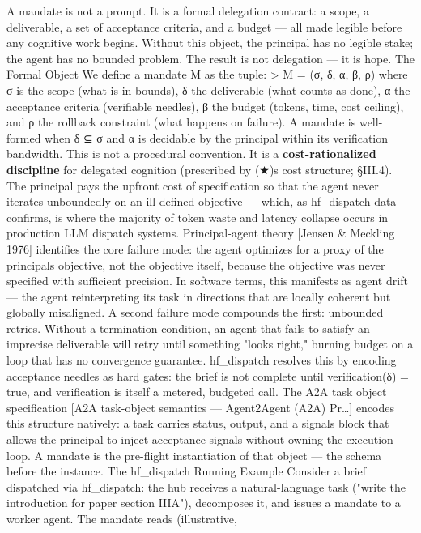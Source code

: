 \documentclass[
]{article}
\begin{document}
A mandate is not a prompt. It is a formal delegation contract: a scope,
a deliverable, a set of acceptance criteria, and a budget --- all made
legible before any cognitive work begins. Without this object, the
principal has no legible stake; the agent has no bounded problem. The
result is not delegation --- it is hope. The Formal Object We define a
mandate M as the tuple: \textgreater{} M = (σ, δ, α, β, ρ) where σ is
the scope (what is in bounds), δ the deliverable (what counts as done),
α the acceptance criteria (verifiable needles), β the budget (tokens,
time, cost ceiling), and ρ the rollback constraint (what happens on
failure). A mandate is well-formed when δ ⊆ σ and α is decidable by the
principal within its verification bandwidth. This is not a procedural
convention. It is a \textbf{cost-rationalized discipline} for delegated
cognition (prescribed by (★)\textquotesingle s cost structure; §III.4).
The principal pays the upfront cost of specification so that the agent
never iterates unboundedly on an ill-defined objective --- which, as
hf\_dispatch data confirms, is where the majority of token waste and
latency collapse occurs in production LLM dispatch systems.
Principal-agent theory {[}Jensen \& Meckling 1976{]} identifies the core
failure mode: the agent optimizes for a proxy of the
principal\textquotesingle s objective, not the objective itself, because
the objective was never specified with sufficient precision. In software
terms, this manifests as agent drift --- the agent reinterpreting its
task in directions that are locally coherent but globally misaligned. A
second failure mode compounds the first: unbounded retries. Without a
termination condition, an agent that fails to satisfy an imprecise
deliverable will retry until something "looks right," burning budget on
a loop that has no convergence guarantee. hf\_dispatch resolves this by
encoding acceptance needles as hard gates: the brief is not complete
until verification(δ) = true, and verification is itself a metered,
budgeted call. The A2A task object specification {[}A2A task-object
semantics --- Agent2Agent (A2A) Pr\ldots{]} encodes this structure
natively: a task carries status, output, and a signals block that allows
the principal to inject acceptance signals without owning the execution
loop. A mandate is the pre-flight instantiation of that object --- the
schema before the instance. The hf\_dispatch Running Example Consider a
brief dispatched via hf\_dispatch: the hub receives a natural-language
task ("write the introduction for paper section IIIA"), decomposes it,
and issues a mandate to a worker agent. The mandate reads (illustrative,
\end{document}
